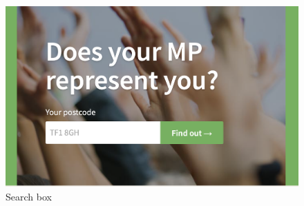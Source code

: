 \begin{figure}[h]
  \centering
  \includegraphics[scale=0.30]{images/they-work-for-you-implementation-search-box}
  \caption{Search box}
  \label{fig:they-work-for-you-implementation-search-box}
\end{figure}